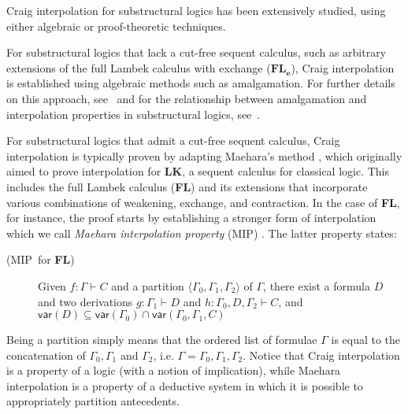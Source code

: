 \documentclass[sn-mathphys-num]{sn-jnl}%
\newcommand{\GG}{\Gamma}
\newcommand{\mf}[1]{\mathsf{#1}}
\newcommand{\gs}[1]{\sigma_{X} (#1)}
\newcommand{\vars}[1]{\mf{var} (#1)}
\newcommand{\FL}{\textbf{FL}}
\newcommand{\MIP}{\textsf{MIP}}
\newcommand{\niccolo}[1]{\textcolor{red}{NV: #1}}
\theoremstyle{thmstyleone}%
\theoremstyle{thmstyletwo}%
\theoremstyle{thmstylethree}%
\begin{document}
Craig interpolation for substructural logics has been extensively studied, using either algebraic or proof-theoretic techniques. 

For substructural logics that lack a cut-free sequent calculus, such as arbitrary extensions of the full Lambek calculus with exchange ($\FL_{\textbf{e}}$), Craig interpolation is established using algebraic methods such as amalgamation.
For further details on this approach, see~\cite{Fussner2024} and for the relationship between amalgamation and interpolation properties in substructural logics, see~\cite{Kihara2009}.

For substructural logics that admit a cut-free sequent calculus, Craig interpolation is typically proven by adapting Maehara's method \cite{maehara1961}, which originally aimed to prove interpolation for $\mathbf{LK}$, a sequent calculus for classical logic.
This includes the full Lambek calculus (\FL) and its extensions that incorporate various combinations of weakening, exchange, and contraction.
In the case of \FL, for instance, the proof starts by establishing a stronger form of interpolation which we call \emph{Maehara interpolation property} (\MIP) \cite{ono:proof:nonclassical:1998}. 
The latter property states:
\begin{description}
  \item[(\MIP~for \FL)] Given $f : \GG \vdash C$ and a partition $\langle \GG_0, \GG_1, \GG_2 \rangle$ of $\GG$, there exist a formula $D$ and two derivations $g : \GG_1 \vdash D$ and $h : \GG_0, D, \GG_2 \vdash C$, and $\vars{D} \subseteq \vars{\GG_0} \cap \vars{\GG_0, \GG_1, C}$
\end{description}
Being a partition simply means that the ordered list of formulae $\GG$ is equal to the concatenation of $\GG_0, \GG_1$ and $\GG_2$, i.e. $\GG = \GG_0, \GG_1, \GG_2$. 
Notice that Craig interpolation is a property of a logic (with a notion of implication), while Maehara interpolation is a property of a deductive system in which it is possible to appropriately partition antecedents.
\end{document}
